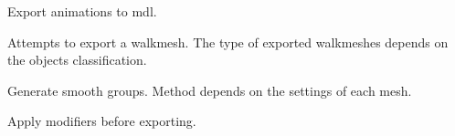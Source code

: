 \begin{description}[leftmargin=12em,style=nextline]
    \item[Export Animations] Export animations to mdl.
    \item[Export Walkmesh] Attempts to export a walkmesh. The type of exported walkmeshes depends on the objects classification.
    \item[Export Smooth Groups] Generate smooth groups. Method depends on the settings of each mesh.
    \item[Apply Modifiers] Apply modifiers before exporting.
\end{description}

